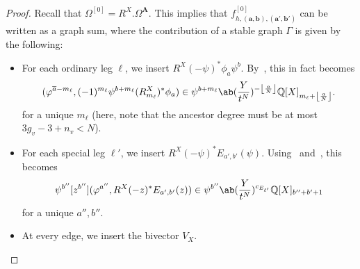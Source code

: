 \documentclass[10pt]{amsart}
\DeclarePairedDelimiter{\floor}{\lfloor}{\rfloor}
\theoremstyle{definition}
\theoremstyle{remark}
\theoremstyle{plain}
\theoremstyle{definition}
\theoremstyle{remark}
\newcommand{\Q}{\mathbb{Q}}
\newcommand{\ba}{\mathbf{a}}
\newcommand{\bb}{\mathbf{b}}
\newcommand{\bA}{\mathbf{A}}
\newcommand{\ol}[1]{\overline{#1}}
\newcommand{\1}{\mathbf{1}}
\newcommand{\2}{\mathbf{2}}
\newcommand{\3}{\mathbf{3}}
\numberwithin{equation}{section}
\begin{document}
\begin{proof}
    Recall that $\Omega^{[0]} = R^X.\Omega^{\bA}$. This implies that $f^{[0]}_{h,(\ba,\bb),(\ba',\bb')}$ can be written as a graph sum, where the contribution of a stable graph $\Gamma$ is given by the following:
    \begin{itemize}
        \item For each ordinary leg $\ell$, we insert $R^X(-\psi)^* \phi_a \psi^b$. By~, this in fact becomes
            \[ (\varphi^{\ol{a} - m_{\ell}}, (-1)^{m_{\ell}}\psi^{b+m_{\ell}}(R^X_{m_{\ell}})^* \phi_a) \in \psi^{b+m_{\ell}} \ab(\frac{Y}{t^N})^{-\floor*{\frac{a}{N}}} \Q[X]_{m_{\ell}+\floor*{\frac{a}{N}}}. \]
            for a unique $m_{\ell}$ (here, note that the ancestor degree must be at most $3g_v-3+n_v < N$).
        \item For each special leg $\ell'$, we insert $R^X(-\psi)^* E_{a',b'}(\psi)$. Using~ and~, this becomes
            \[ \psi^{b''} [z^{b''}] (\varphi^{a''}, R^X(-z)^* E_{a',b'}(z)) \in \psi^{b''} \ab(\frac{Y}{t^N})^{c_{E_{\ell'}}} \Q[X]_{b''+b'+1} \]
            for a unique $a'', b''$.
        \item At every edge, we insert the bivector $V_X$.
    \end{itemize}


\end{proof}
\end{document}
